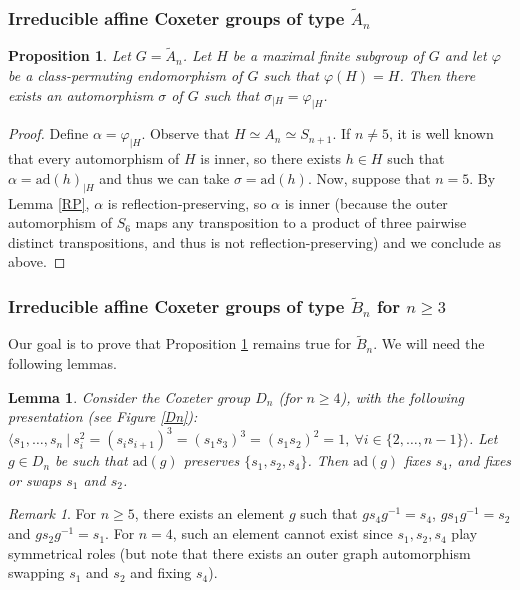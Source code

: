 \documentclass[a4paper, 11pt]{amsart}
\newtheorem{prop}[te]{Proposition}
\newtheorem{lemme}[te]{Lemma}
\theoremstyle{definition}
\theoremstyle{remark}
\newtheorem{rk}[te]{Remark}
\renewcommand{\geq}{\geqslant}
\begin{document}
\subsubsection{Irreducible affine Coxeter groups of type $\tilde{A}_n$}

\begin{prop}\label{tildeAn}
Let $G=\tilde{A}_n$. Let $H$ be a maximal finite subgroup of $G$ and let $\varphi$ be a class-permuting endomorphism of $G$ such that $\varphi(H)=H$. Then there exists an automorphism $\sigma$ of $G$ such that $\sigma_{\vert H}=\varphi_{\vert H}$.
\end{prop}

\begin{proof}
Define $\alpha=\varphi_{\vert H}$. Observe that $H \simeq A_n\simeq S_{n+1}$. If $n\neq 5$, it is well known that every automorphism of $H$ is inner, so there exists $h\in H$ such that $\alpha=\mathrm{ad}(h)_{\vert H}$ and thus we can take $\sigma=\mathrm{ad}(h)$. Now, suppose that $n=5$. By Lemma \ref{RP}, $\alpha$ is reflection-preserving, so $\alpha$ is inner (because the outer automorphism of $S_6$ maps any transposition to a product of three pairwise distinct transpositions, and thus is not reflection-preserving) and we conclude as above.\end{proof}

\subsubsection{Irreducible affine Coxeter groups of type $\tilde{B}_n$ for $n\geq 3$} Our goal is to prove that Proposition \ref{tildeAn} remains true for $\tilde{B}_n$. We will need the following lemmas.

\begin{lemme}\label{D_n}
Consider the Coxeter group $D_n$ (for $n\geq 4$), with the following presentation (see Figure \ref{Dn}): $\langle s_1,\ldots,s_n \ \vert \ s_i^2= (s_is_{i+1})^3=(s_1s_3)^3=(s_1s_2)^2=1, \ \forall i\in \lbrace 2,\ldots, n-1\rbrace\rangle$. Let $g\in D_n$ be such that $\mathrm{ad}(g)$ preserves $\lbrace s_1,s_2,s_4\rbrace$. Then $\mathrm{ad}(g)$ fixes $s_4$, and fixes or swaps $s_1$ and $s_2$.\end{lemme}

\begin{rk}
For $n\geq 5$, there exists an element $g$ such that $gs_4g^{-1}=s_4$, $gs_1g^{-1}=s_2$ and $gs_2g^{-1}=s_1$. For $n=4$, such an element cannot exist since $s_1,s_2,s_4$ play symmetrical roles (but note that there exists an outer graph automorphism swapping $s_1$ and $s_2$ and fixing $s_4$).
\end{rk}
\end{document}
